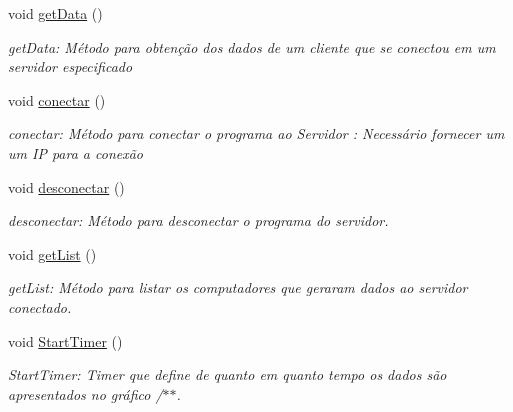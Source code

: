 \begin{DoxyCompactItemize}
\item 
\mbox{\label{class_main_window_a4a2ddf4cf2ec8e240cc340416b1df792}} 
void \hyperlink{class_main_window_a4a2ddf4cf2ec8e240cc340416b1df792}{get\+Data} ()
\begin{DoxyCompactList}\small\item\em get\+Data\+: Método para obtenção dos dados de um cliente que se conectou em um servidor especificado \end{DoxyCompactList}\item 
\mbox{\label{class_main_window_a62000ffa1534df6799cb64acc977e285}} 
void \hyperlink{class_main_window_a62000ffa1534df6799cb64acc977e285}{conectar} ()
\begin{DoxyCompactList}\small\item\em conectar\+: Método para conectar o programa ao Servidor \+: Necessário fornecer um um IP para a conexão \end{DoxyCompactList}\item 
\mbox{\label{class_main_window_a44cae809331c23b6fdce421d11add74d}} 
void \hyperlink{class_main_window_a44cae809331c23b6fdce421d11add74d}{desconectar} ()
\begin{DoxyCompactList}\small\item\em desconectar\+: Método para desconectar o programa do servidor. \end{DoxyCompactList}\item 
\mbox{\label{class_main_window_a0a96397a2da7a7e1c49d59b6bc1f72a7}} 
void \hyperlink{class_main_window_a0a96397a2da7a7e1c49d59b6bc1f72a7}{get\+List} ()
\begin{DoxyCompactList}\small\item\em get\+List\+: Método para listar os computadores que geraram dados ao servidor conectado. \end{DoxyCompactList}\item 
void \hyperlink{class_main_window_a6ab0b8fe470b5a5d992fd4a2c3bcf884}{Start\+Timer} ()
\begin{DoxyCompactList}\small\item\em Start\+Timer\+: Timer que define de quanto em quanto tempo os dados são apresentados no gráfico /$\ast$$\ast$. \end{DoxyCompactList}\item 

\end{DoxyCompactItemize}
